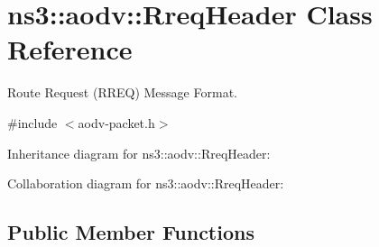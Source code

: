 \hypertarget{classns3_1_1aodv_1_1RreqHeader}{}\section{ns3\+:\+:aodv\+:\+:Rreq\+Header Class Reference}
\label{classns3_1_1aodv_1_1RreqHeader}


Route Request (R\+R\+EQ) Message Format.  




{\ttfamily \#include $<$aodv-\/packet.\+h$>$}



Inheritance diagram for ns3\+:\+:aodv\+:\+:Rreq\+Header\+:


Collaboration diagram for ns3\+:\+:aodv\+:\+:Rreq\+Header\+:
\subsection*{Public Member Functions}

